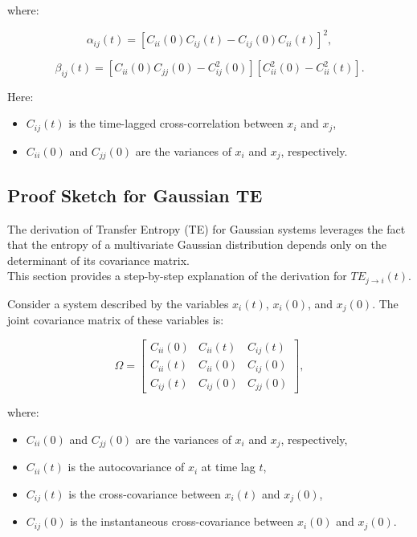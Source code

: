 \documentclass[English, Lau, oneside]{sapthesis}
\begin{document}
where:

\begin{equation}
\alpha_{ij}(t) = \left[C_{ii}(0)C_{ij}(t) - C_{ij}(0)C_{ii}(t)\right]^2,\label{alpha}
\end{equation}

\begin{equation}
\beta_{ij}(t) = \left[C_{ii}(0)C_{jj}(0) - C_{ij}^2(0)\right]\left[C_{ii}^2(0) - C_{ii}^2(t)\right].\label{beta}
\end{equation}

Here:
\begin{itemize}
    \item \(C_{ij}(t)\) is the time-lagged cross-correlation between \(x_i\) and \(x_j\),
    \item \(C_{ii}(0)\) and \(C_{jj}(0)\) are the variances of \(x_i\) and \(x_j\), respectively.
\end{itemize}
\subsection*{Proof Sketch for Gaussian TE}

The derivation of Transfer Entropy (TE) for Gaussian systems leverages the fact that the entropy of a multivariate Gaussian distribution depends only on the determinant of its covariance matrix.\\
This section provides a step-by-step explanation of the derivation for \( TE_{j \to i}(t) \).\cite{ref13}



Consider a system described by the variables \(x_i(t)\), \(x_i(0)\), and \(x_j(0)\). The joint covariance matrix of these variables is:

\[
\Omega = \begin{bmatrix}
C_{ii}(0) & C_{ii}(t) & C_{ij}(t) \\
C_{ii}(t) & C_{ii}(0) & C_{ij}(0) \\
C_{ij}(t) & C_{ij}(0) & C_{jj}(0)
\end{bmatrix},
\]

where:
\begin{itemize}
    \item \(C_{ii}(0)\) and \(C_{jj}(0)\) are the variances of \(x_i\) and \(x_j\), respectively,
    \item \(C_{ii}(t)\) is the autocovariance of \(x_i\) at time lag \(t\),
    \item \(C_{ij}(t)\) is the cross-covariance between \(x_i(t)\) and \(x_j(0)\),
    \item \(C_{ij}(0)\) is the instantaneous cross-covariance between \(x_i(0)\) and \(x_j(0)\).
\end{itemize}
\end{document}
